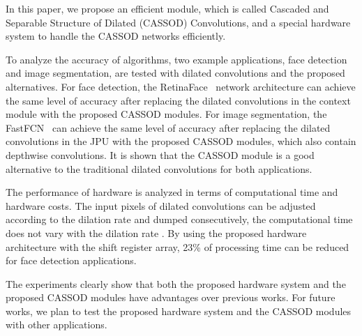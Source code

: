 \documentclass[10pt,twocolumn,letterpaper]{article}
\begin{document}
In this paper, we propose an efficient module, which is called Cascaded and Separable Structure of Dilated (CASSOD) Convolutions, and a special hardware system to handle the CASSOD networks efficiently. 

To analyze the accuracy of algorithms, two example applications, face detection and image segmentation, are tested with dilated convolutions and the proposed alternatives. For face detection, the RetinaFace~\cite{Deng19} network architecture can achieve the same level of accuracy after replacing the dilated convolutions in the context module with the proposed CASSOD modules. For image segmentation, the FastFCN~\cite{Wu19} can achieve the same level of accuracy after replacing the dilated convolutions in the JPU with the proposed CASSOD modules, which also contain depthwise convolutions. It is shown that the CASSOD module is a good alternative to the traditional dilated convolutions for both applications.

The performance of hardware is analyzed in terms of computational time and hardware costs. The input pixels of dilated convolutions can be adjusted according to the dilation rate   and dumped consecutively, the computational time does not vary with the dilation rate . By using the proposed hardware architecture with the shift register array, 23\% of processing time can be reduced for face detection applications.

The experiments clearly show that both the proposed hardware system and the proposed CASSOD modules have advantages over previous works. For future works, we plan to test the proposed hardware system and the CASSOD modules with other applications.

{\small


}
\end{document}
